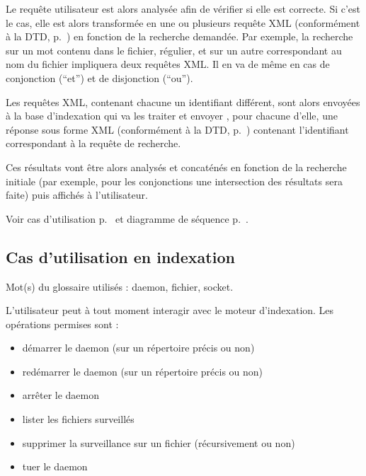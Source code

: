 \documentclass[a4paper,12pt]{report}
\begin{document}
Le requête utilisateur est alors analysée afin de vérifier si elle est correcte. Si c'est le cas, elle est alors transformée en une ou plusieurs requête XML (conformément à la DTD, p.~\pageref{dtd_bi_mr_search}) en fonction de la recherche demandée. Par exemple, la recherche sur un mot contenu dans le fichier, régulier, et sur un autre correspondant au nom du fichier impliquera deux requêtes XML. Il en va de même en cas de conjonction (\enquote{et}) et de disjonction (\enquote{ou}).

Les requêtes XML, contenant chacune un identifiant différent, sont alors envoyées à la base d'indexation qui va les traiter et envoyer , pour chacune d'elle, une réponse sous forme XML (conformément à la DTD, p.~\pageref{dtd_bi_mr_result}) contenant l'identifiant correspondant à la requête de recherche.

Ces résultats vont être alors analysés et concaténés en fonction de la recherche initiale (par exemple, pour les conjonctions une intersection des résultats sera faite) puis affichés à l'utilisateur.

Voir cas d'utilisation p.~\pageref{utilisation-recherche} et diagramme de séquence p.~\pageref{sequence-recherche}.

\subsection{Cas d'utilisation en indexation}
Mot(s) du glossaire utilisés : \gls{daemon}, \gls{fichier}, \gls{socket}.

L'utilisateur peut à tout moment interagir avec le moteur d'indexation. Les opérations permises sont :
\begin{itemize}
\item démarrer le daemon (sur un répertoire précis ou non)
\item redémarrer le daemon (sur un répertoire précis ou non)
\item arrêter le daemon
\item lister les fichiers surveillés
\item supprimer la surveillance sur un fichier (récursivement ou non)
\item tuer le daemon
\end{itemize}
\end{document}
